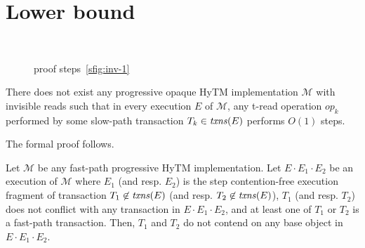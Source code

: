 \section{Lower bound}
%
%
\begin{figure*}[t]
\begin{center}
        \\
        \vspace{2mm}
	\caption{proof steps~\ref{sfig:inv-1}
        \label{fig:indis}} 
\end{center}
\end{figure*}
%
%
\begin{theorem}
\label{th:impossibility}
There does not exist any progressive opaque HyTM implementation $\mathcal{M}$ with invisible reads such that in every execution $E$ of $\mathcal{M}$, any t-read operation $op_k$ performed by some slow-path transaction $T_k \in \ms{txns}(E)$
performs $O(1)$ steps.
\end{theorem}
%
\begin{proofsketch}
%
\end{proofsketch}
%
The formal proof follows.
%
\begin{lemma}
\label{lm:hytm}
%
Let $\mathcal{M}$ be any fast-path progressive HyTM implementation.
Let $E\cdot E_1 \cdot E_2$ be an execution of $\mathcal{M}$ where
$E_1$ (and resp. $E_2$) is the step contention-free
execution fragment of transaction $T_1 \not\in \ms{txns}(E)$ (and
resp. $T_2 \not\in \ms{txns}(E)$),
$T_1$ (and resp. $T_2$) does not conflict with any transaction in $E\cdot E_1 \cdot E_2$, and
at least one of $T_1$ or $T_2$ is a fast-path transaction. 
Then, $T_1$ and $T_2$ do not contend on any base object in $E\cdot E_1 \cdot E_2$.
\end{lemma}
%
